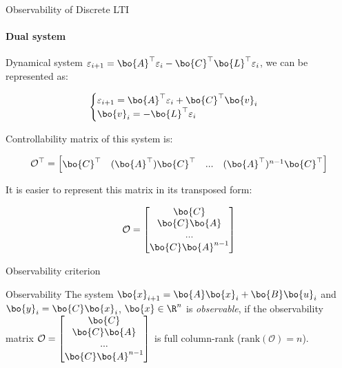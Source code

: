 \documentclass{beamer}
\begin{document}
\begin{frame}{Observability of Discrete LTI}
\framesubtitle{Dual system}
\begin{flushleft}

Dynamical system $\varepsilon_{i+1} = \bo{A}^\top \varepsilon_i - \bo{C}^\top \bo{L}^\top \varepsilon_i$, we can be represented as:

\begin{equation}
\begin{cases}
\varepsilon_{i+1} = \bo{A}^\top \varepsilon_i + \bo{C}^\top \bo{v}_i \\
\bo{v}_i = - \bo{L}^\top \varepsilon_i
\end{cases}
\end{equation}

Controllability matrix of this system is:

\begin{equation}
\mathcal{O}^\top = \begin{bmatrix}
    \bo{C}^\top &
    (\bo{A}^\top) \bo{C}^\top & ... &
    (\bo{A}^\top)^{n - 1} \bo{C}^\top
    \end{bmatrix}
\end{equation}

It is easier to represent this matrix in its transposed form:

\begin{equation}
\mathcal{O} = \begin{bmatrix}
    \bo{C} \\
    \bo{C}\bo{A}  \\ ... \\
    \bo{C}\bo{A}^{n - 1}
    \end{bmatrix}
\end{equation}

\end{flushleft}
\end{frame}


\begin{frame}{Observability criterion}
\begin{flushleft}

\begin{block}{Observability}
The system $\bo{x}_{i+1} = \bo{A}  \bo{x}_i + \bo{B} \bo{u}_i$ and $\bo{y}_i = \bo{C}  \bo{x}_i$, $\bo{x} \in \R^n$ is \emph{observable}, if the observability matrix $\mathcal{O} = \begin{bmatrix}
    \bo{C} \\
    \bo{C}\bo{A}  \\ ... \\
    \bo{C}\bo{A}^{n - 1}
    \end{bmatrix}$ is full column-rank ($\text{rank}(\mathcal{O}) = n$).
\end{block}

\end{flushleft}
\end{frame}
\end{document}
